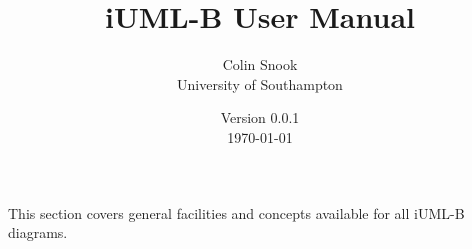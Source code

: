 \documentclass[a4paper,10pt]{article}
\title{iUML-B User Manual}
\author{Colin Snook\\University of Southampton}
\date{%
  Version 0.0.1\\%
  \today%
}
\begin{document}
\ifplastex%
\maketitle%
\else%
 \ifstandalone%
 \maketitle %
 \else%
 \fi%
\fi%

This section covers general facilities and concepts available for all iUML-B diagrams.







%
%
%
%
%
\end{document}
